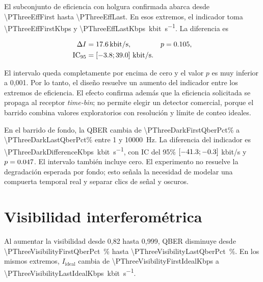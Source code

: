 El subconjunto de eficiencia con holgura confirmada abarca desde \num[round-mode=places,round-precision=2]{\PThreeEffFirst} hasta \num[round-mode=places,round-precision=2]{\PThreeEffLast}. En esos extremos, el indicador toma \num[round-mode=places,round-precision=1]{\PThreeEffFirstKbps} y \SI[round-mode=places,round-precision=1]{\PThreeEffLastKbps}{\kilo bit\per\second}. La diferencia es

\begin{align*}
  \Delta I & = \SI[round-mode=places,round-precision=1]{\PThreeEffDifferenceKbps}{\kilo bit\per\second},
  & p & = \num[round-mode=places,round-precision=3]{\PThreeEffPValue}, \\
  \mathrm{IC}_{95} & =
  [\num[round-mode=places,round-precision=1]{\PThreeEffDifferenceLowKbps};
   \num[round-mode=places,round-precision=1]{\PThreeEffDifferenceHighKbps}]\ \text{kbit/s}. &&
\end{align*}

El intervalo queda completamente por encima de cero y el valor \(p\) es muy inferior a 0,001. Por lo tanto, el diseño resuelve un aumento del indicador entre los extremos de eficiencia. El efecto confirma además que la eficiencia solicitada se propaga al receptor \textit{time-bin}; no permite elegir un detector comercial, porque el barrido combina valores exploratorios con resolución y límite de conteo ideales.

En el barrido de fondo, la QBER cambia de \num[round-mode=places,round-precision=3]{\PThreeDarkFirstQberPct}\% a \num[round-mode=places,round-precision=3]{\PThreeDarkLastQberPct}\% entre 1 y \SI{10000}{\hertz}. La diferencia del indicador es \SI[round-mode=places,round-precision=1]{\PThreeDarkDifferenceKbps}{\kilo bit\per\second}, con IC del 95\% \([\num[round-mode=places,round-precision=1]{\PThreeDarkDifferenceLowKbps};\num[round-mode=places,round-precision=1]{\PThreeDarkDifferenceHighKbps}]\) kbit/s y \(p=\num[round-mode=places,round-precision=3]{\PThreeDarkPValue}\). El intervalo también incluye cero. El experimento no resuelve la degradación esperada por fondo; esto señala la necesidad de modelar una compuerta temporal real y separar clics de señal y oscuros.

\section{Visibilidad interferométrica}

Al aumentar la visibilidad desde 0,82 hasta 0,999, QBER disminuye desde \SI[round-mode=places,round-precision=3]{\PThreeVisibilityFirstQberPct}{\percent} hasta \SI[round-mode=places,round-precision=3]{\PThreeVisibilityLastQberPct}{\percent}. En los mismos extremos, \(I_\mathrm{ideal}\) cambia de \num[round-mode=places,round-precision=1]{\PThreeVisibilityFirstIdealKbps} a \SI[round-mode=places,round-precision=1]{\PThreeVisibilityLastIdealKbps}{\kilo bit\per\second}.

